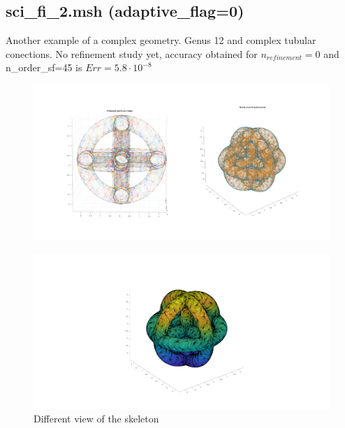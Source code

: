 \documentclass[11pt, oneside]{article}   	%
\begin{document}
\subsection{sci\_fi\_2.msh (adaptive\_flag=0)}
Another example of a complex geometry. Genus 12 and complex tubular conections. No refinement study yet, accuracy obtained for $n_{refinement}=0$ and n\_order\_sf=45 is $Err=5.8\cdot 10^{-8}$
\begin{figure}[H]
\begin{center}
\includegraphics[width=6in]{sci_fi_2.pdf}
\end{center}
\caption{}
\label{sci_fi_2}
\end{figure}

\begin{figure}[H]
\begin{center}
\includegraphics[width=6in]{sci_fi_2_skeleton_view_1.pdf}
\end{center}
\caption{Different view of the skeleton}
\label{sci_fi_2_skeleton_1}
\end{figure}
\end{document}
